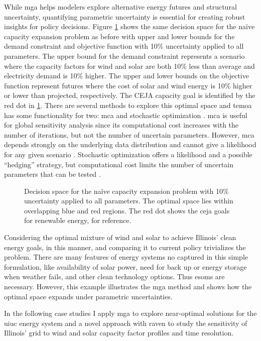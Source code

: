 While \gls{mga} helps modelers explore alternative energy futures and structural
uncertainty, quantifying parametric uncertainty is essential for creating robust insights
for policy decisions. Figure \ref{fig:param-fig} shows the same decision space for
the na\"{i}ve capacity expansion problem as before with upper and lower bounds for
the demand constraint and objective function with 10\% uncertainty applied to all
parameters. The upper bound for the demand constraint represents a scenario where
the capacity factors for wind and solar are both 10\% less than average and electricity
demand is 10\% higher. The upper and lower bounds on the objective function represent
futures where the cost of solar and wind energy is 10\% higher or lower than
projected, respectively. The CEJA capacity goal is identified by the red dot in
\ref{fig:param-fig}. There are several methods to explore this optimal space and
\gls{temoa} has some functionality for two: \gls{mca} \cite{yue_review_2018} and
stochastic optimization \cite{decarolis_multi-stage_2012, bennett_extending_2021}.
\gls{mca} is useful for global sensitivity analysis since its computational
cost increases with the number of iterations, but not the number of uncertain
parameters. However, \gls{mca} depends strongly on the underlying data distribution
and cannot give a likelihood for any given scenario \cite{yue_review_2018}.
Stochastic optimization offers a likelihood and a possible ``hedging'' strategy,
but computational cost limits the number of uncertain parameters that can be
tested \cite{yue_review_2018}.

\begin{figure}[H]
  \centering
  \resizebox{0.8\columnwidth}{!}{}
  \caption{Decision space for the na\"{i}ve capacity expansion problem with
  10\% uncertainty applied to all parameters. The optimal space lies within
  overlapping blue and red regions. The red dot shows the \gls{ceja} goals for
  renewable energy, for reference.}
  \label{fig:param-fig}
\end{figure}
Considering the optimal mixture of wind and solar to achieve Illinois' clean
energy goals, in this manner, and comparing it to current policy trivializes the
problem. There are many features of energy systems no captured in this simple formulation,
like availability of solar power, need for back up or energy storage when weather
fails, and other clean technology options. Thus \glspl{esom} are necessary. However,
this example illustrates the \gls{mga} method and shows how the optimal space
expands under parametric uncertainties.

In the following case studies I apply \gls{mga} to explore near-optimal solutions
for the \gls{uiuc} energy system and a novel approach with \gls{raven} to study
the sensitivity of Illinois' grid to wind and solar capacity factor profiles and
time resolution.
